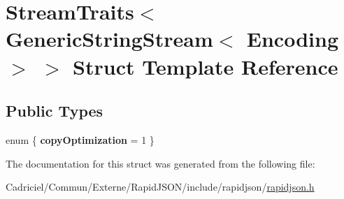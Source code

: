 \hypertarget{struct_stream_traits_3_01_generic_string_stream_3_01_encoding_01_4_01_4}{}\section{Stream\+Traits$<$ Generic\+String\+Stream$<$ Encoding $>$ $>$ Struct Template Reference}
\label{struct_stream_traits_3_01_generic_string_stream_3_01_encoding_01_4_01_4}
\subsection*{Public Types}
\begin{DoxyCompactItemize}
\item 
enum \{ {\bfseries copy\+Optimization} = 1
 \}\hypertarget{struct_stream_traits_3_01_generic_string_stream_3_01_encoding_01_4_01_4_adeb93fe42f819f86ffe3d85eca30a9f9}{}\label{struct_stream_traits_3_01_generic_string_stream_3_01_encoding_01_4_01_4_adeb93fe42f819f86ffe3d85eca30a9f9}

\end{DoxyCompactItemize}


The documentation for this struct was generated from the following file\+:\begin{DoxyCompactItemize}
\item 
Cadriciel/\+Commun/\+Externe/\+Rapid\+J\+S\+O\+N/include/rapidjson/\hyperlink{rapidjson_8h}{rapidjson.\+h}\end{DoxyCompactItemize}
